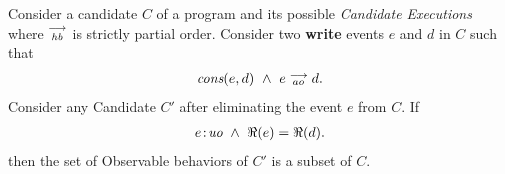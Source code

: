 \begin{theorem}
    \label{WriteElim}
    Consider a candidate $C$ of a program and its possible \textit{Candidate Executions} where $\stackrel{\longrightarrow}{_\textit{hb}}$ is strictly partial order. 
    Consider two \textbf{write} events $e$ and $d$ in $C$ such that 
    \begin{align*}
        \textit{cons}(e,d) \ \wedge \ e\stackrel{\longrightarrow}{_{ao}}d. 
    \end{align*}
    Consider any Candidate $C'$ after eliminating the event $e$ from $C$.  
    If
    \begin{align*}
        e\!:\!\textit{uo} \ \wedge \ \Re(e) = \Re(d). 
    \end{align*}
    then the set of Observable behaviors of $C'$ is a subset of $C$.  
\end{theorem}
